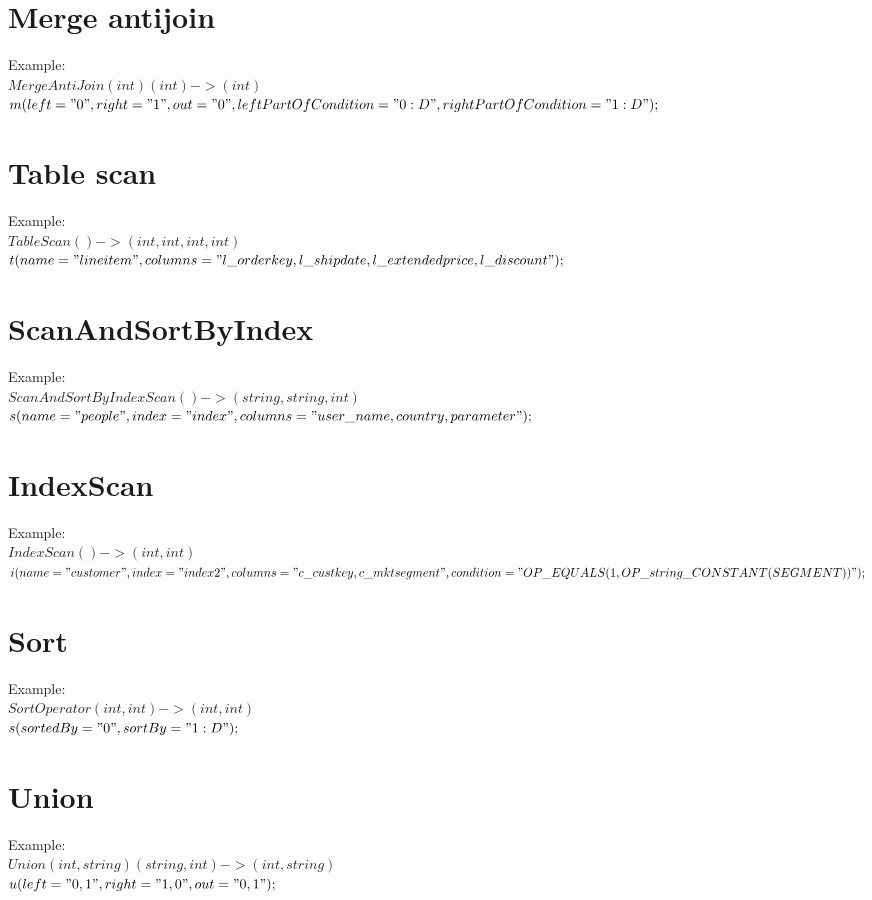 \documentclass{article}
\begin{document}
\section{Merge antijoin}
Example:\\
$MergeAntiJoin(int)(int)->(int)$\\
$m(left="0",right="1",out="0",leftPartOfCondition="0:D",rightPartOfCondition="1:D");$\\ 


\section{Table scan}
Example:\\
$TableScan()->(int,int,int,int)$\\
$t(name="lineitem",columns="l\_orderkey,l\_shipdate,l\_extendedprice,l\_discount");$\\ 


\section{ScanAndSortByIndex}
Example:\\
$ScanAndSortByIndexScan()->(string,string,int)$\\
$s(name="people",index="index",columns="user\_name,country,parameter"); $\\ 



\section{IndexScan}
Example:\\
$IndexScan()->(int,int)$\\
$i(name="customer",index="index2",columns="c\_custkey,c\_mktsegment",condition="OP\_EQUALS(1,OP\_string\_CONSTANT(SEGMENT))");$

\section{Sort}
Example:\\
$SortOperator(int,int)->(int,int)$\\
$s(sortedBy="0",sortBy="1:D");$\\

\section{Union}
Example:\\
$Union(int,string)(string,int)->(int,string)$\\
$ u(left="0,1",right="1,0",out="0,1");$\\
\end{document}
